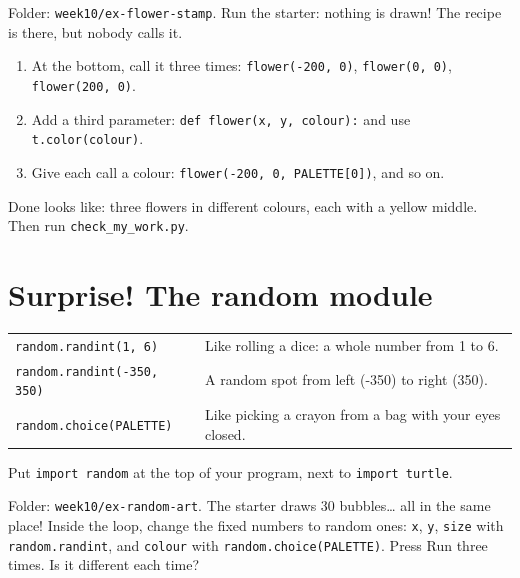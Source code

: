 \begin{exercise}
Folder: \texttt{week10/ex-flower-stamp}. Run the starter: nothing is drawn! The recipe is there, but nobody calls it.
\begin{enumerate}[leftmargin=1.4em,itemsep=1pt]
  \item At the bottom, call it three times: \texttt{flower(-200, 0)}, \texttt{flower(0, 0)}, \texttt{flower(200, 0)}.
  \item Add a third parameter: \texttt{def flower(x, y, colour):} and use \texttt{t.color(colour)}.
  \item Give each call a colour: \texttt{flower(-200, 0, PALETTE[0])}, and so on.
\end{enumerate}
Done looks like: three flowers in different colours, each with a yellow middle. Then run \texttt{check\_my\_work.py}.
\end{exercise}

\section{Surprise! The random module}
\begin{center}
\renewcommand{\arraystretch}{1.5}
\begin{tabularx}{\linewidth}{@{}p{6.9cm}>{\raggedright\arraybackslash}X@{}}
\toprule
\texttt{random.randint(1, 6)} & Like rolling a dice: a whole number from 1 to 6.\\
\texttt{random.randint(-350, 350)} & A random spot from left (-350) to right (350).\\
\texttt{random.choice(PALETTE)} & Like picking a crayon from a bag with your eyes closed.\\
\bottomrule
\end{tabularx}
\end{center}
Put \texttt{import random} at the top of your program, next to \texttt{import turtle}.

\begin{exercise}
Folder: \texttt{week10/ex-random-art}. The starter draws 30 bubbles\ldots{} all in the same place! Inside the loop, change the fixed numbers to random ones: \texttt{x}, \texttt{y}, \texttt{size} with \texttt{random.randint}, and \texttt{colour} with \texttt{random.choice(PALETTE)}. Press Run three times. Is it different each time?
\end{exercise}

